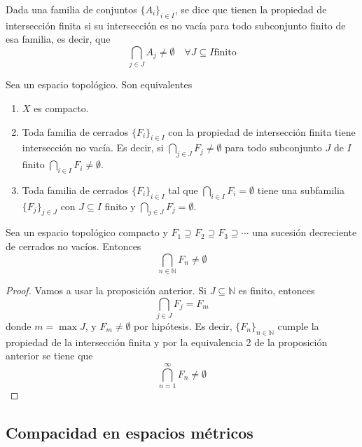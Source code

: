 \documentclass{apuntes}
\begin{document}
\begin{defn} Dada una familia de conjuntos $\{A_i\}_{i∈I}$, se dice que tienen la propiedad de intersección finita si su intersección es no vacía para todo subconjunto finito de esa familia, es decir, que \[ \bigcap_{j∈J} A_j ≠ ∅ \quad ∀J⊆I \text{finito} \]

\end{defn}

\begin{prop} Sea \tops un espacio topológico. Son equivalentes
\begin{enumerate}
	\item $X$ es compacto.
	\item Toda familia de cerrados $\{F_i\}_{i∈I}$ con la propiedad de intersección finita tiene intersección no vacía. Es decir, si $\bigcap_{j∈J} F_j ≠  ∅$ para todo subconjunto $J$ de $I$ finito $\bigcap_{i∈I} F_i ≠ ∅$.
	\item Toda familia de cerrados $\{F_i\}_{i∈I}$ tal que $\bigcap_{i∈I} F_i = ∅$ tiene una subfamilia $\{F_j\}_{j∈J}$ con $J⊆I$ finito y $\bigcap_{j∈J}F_j = ∅$.
\end{enumerate}
\end{prop}

\begin{corol} Sea \tops un espacio topológico compacto y $F_1 ⊇ F_2 ⊇ F_3 ⊇ \dotsb$ una sucesión decreciente de cerrados no vacíos. Entonces \[ \bigcap_{n∈ℕ} F_n ≠ ∅\]
\end{corol}

\begin{proof}
Vamos a usar la proposición anterior. Si $J⊆ℕ$ es finito, entonces  \[ \bigcap_{j∈J} F_j = F_m\] donde $m = \max J$, y $F_m ≠∅$ por hipótesis. Es decir, $\{F_n\}_{n∈ℕ}$ cumple la propiedad de la intersección finita y por la equivalencia 2 de la proposición anterior se tiene que \[ \bigcap_{n=1}^∞ F_n ≠ ∅\]
\end{proof}

\subsection{Compacidad en espacios métricos}
\end{document}

